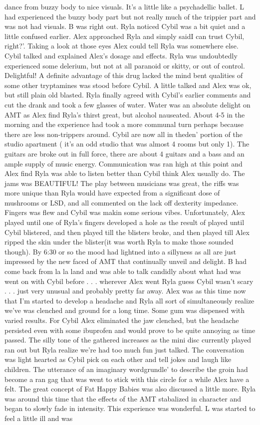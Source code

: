 \documentclass[12pt]{book}
\begin{document}
dance from buzzy body to nice visuals. It's a little like a psychadellic ballet. L had experienced the buzzy body part but not really much of the trippier part and was not had visuals. B was right out. Ryla noticed Cybil was a bit quiet and a little confused earlier. Alex approached Ryla and simply saidI can trust Cybil, right?'. Taking a look at those eyes Alex could tell Ryla was somewhere else. Cybil talked and explained Alex's dosage and effects. Ryla was undoubtedly experienced some delerium, but not at all paranoid or skitty, or out of control. Delightful! A definite advantage of this drug lacked the mind bent qualities of some other tryptamines was stood before Cybil. A little talked and Alex was ok, but still plain old blasted. Ryla finally agreed with Cybil's earlier comments and cut the drank and took a few glasses of water. Water was an absolute delight on AMT as Alex find Ryla's thirst great, but alcohol nauseated. About 4-5 in the morning and the experience had took a more communal turn perhaps because there are less non-trippers around. Cybil are now all in theden' portion of the studio apartment ( it's an odd studio that was almost 4 rooms but only 1). The guitars are broke out in full force, there are about 4 guitars and a bass and an ample supply of music energy. Communication was ran high at this point and Alex find Ryla was able to listen better than Cybil think Alex usually do. The jams was BEAUTIFUL! The play between musicians was great, the riffs was more unique than Ryla would have expected from a significant dose of mushrooms or LSD, and all commented on the lack off dexterity impedance. Fingers was flew and Cybil was makin some serious vibes. Unfortunately, Alex played until one of Ryla's fingers developed a hole as the result of played until Cybil blistered, and then played till the blisters broke, and then played till Alex ripped the skin under the blister(it was worth Ryla to make those sounded though). By 6:30 or so the mood had lightned into a sillyness as all are just impressed by the new faced of AMT that continually unveil and delight. B had come back from la la land and was able to talk candidly about what had was went on with Cybil before . . .  wherever Alex went Ryla guess Cybil wasn't scary . . .  just very unusual and probably pretty far away. Alex was as this time now that I'm started to develop a headache and Ryla all sort of simultaneously realize we've was clenched and ground for a long time. Some gum was dispensed with varied results. For Cybil Alex eliminated the jaw clenched, but the headache persisted even with some ibuprofen and would prove to be quite annoying as time passed. The silly tone of the gathered increases as the mini disc currently played ran out but Ryla realize we're had too much fun just talked. The conversation was light hearted as Cybil pick on each other and tell jokes and laugh like children. The utterance of an imaginary wordgrundle' to describe the groin had become a ran gag that was went to stick with this circle for a while Alex have a felt. The great concept of Fat Happy Babies was also discussed a little more. Ryla was around this time that the effects of the AMT stabalized in character and began to slowly fade in intensity. This experience was wonderful. L was started to feel a little ill and was 
\end{document}
